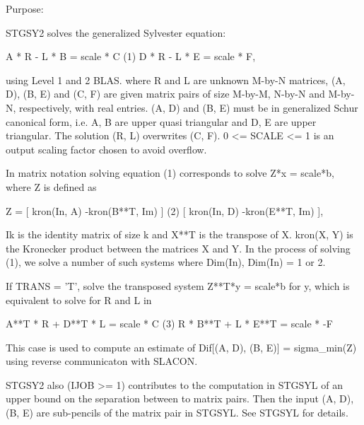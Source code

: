  \begin{DoxyParagraph}{Purpose\+: }
\begin{DoxyVerb} STGSY2 solves the generalized Sylvester equation:

             A * R - L * B = scale * C                (1)
             D * R - L * E = scale * F,

 using Level 1 and 2 BLAS. where R and L are unknown M-by-N matrices,
 (A, D), (B, E) and (C, F) are given matrix pairs of size M-by-M,
 N-by-N and M-by-N, respectively, with real entries. (A, D) and (B, E)
 must be in generalized Schur canonical form, i.e. A, B are upper
 quasi triangular and D, E are upper triangular. The solution (R, L)
 overwrites (C, F). 0 <= SCALE <= 1 is an output scaling factor
 chosen to avoid overflow.

 In matrix notation solving equation (1) corresponds to solve
 Z*x = scale*b, where Z is defined as

        Z = [ kron(In, A)  -kron(B**T, Im) ]             (2)
            [ kron(In, D)  -kron(E**T, Im) ],

 Ik is the identity matrix of size k and X**T is the transpose of X.
 kron(X, Y) is the Kronecker product between the matrices X and Y.
 In the process of solving (1), we solve a number of such systems
 where Dim(In), Dim(In) = 1 or 2.

 If TRANS = 'T', solve the transposed system Z**T*y = scale*b for y,
 which is equivalent to solve for R and L in

             A**T * R  + D**T * L   = scale * C           (3)
             R  * B**T + L  * E**T  = scale * -F

 This case is used to compute an estimate of Dif[(A, D), (B, E)] =
 sigma_min(Z) using reverse communicaton with SLACON.

 STGSY2 also (IJOB >= 1) contributes to the computation in STGSYL
 of an upper bound on the separation between to matrix pairs. Then
 the input (A, D), (B, E) are sub-pencils of the matrix pair in
 STGSYL. See STGSYL for details.\end{DoxyVerb}
 
\end{DoxyParagraph}

